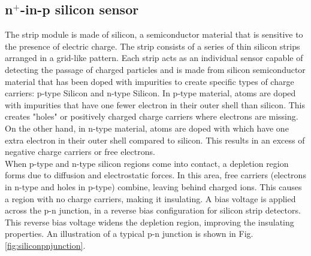 \subsection{n$^+$-in-p silicon sensor}
The strip module is made of silicon, a semiconductor material that is sensitive to the presence of electric charge. The strip consists of a series of thin silicon strips arranged in a grid-like pattern. Each strip acts as an individual sensor capable of detecting the passage of charged particles and is made from silicon semiconductor material that has been doped with impurities to create specific types of charge carriers: p-type Silicon and n-type Silicon. In p-type material, atoms are doped with impurities that have one fewer electron in their outer shell than silicon. This creates "holes" or positively charged charge carriers where electrons are missing. On the other hand, in n-type material, atoms are doped with which have one extra electron in their outer shell compared to silicon. This results in an excess of negative charge carriers or free electrons.\\
When p-type and n-type silicon regions come into contact, a depletion region forms due to diffusion and electrostatic forces. In this area, free carriers (electrons in n-type and holes in p-type) combine, leaving behind charged ions. This causes a region with no charge carriers, making it insulating. A bias voltage is applied across the p-n junction, in a reverse bias configuration for silicon strip detectors. This reverse bias voltage widens the depletion region, improving the insulating properties. An illustration of a typical p-n junction is shown in Fig.\ref{fig:siliconpnjunction}.\\

